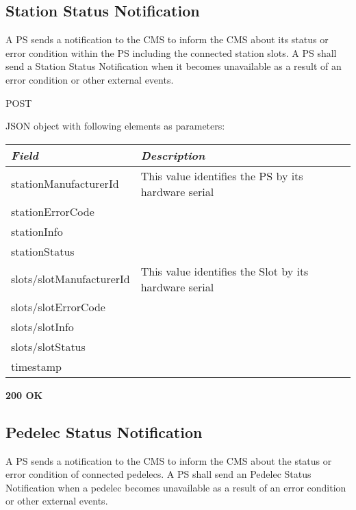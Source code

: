 
\subsection{Station Status Notification}

A \acs{PS} sends a notification to the \acs{CMS} to inform the \acs{CMS} about its status or error condition within the \acs{PS} including the connected station slots. A \acs{PS} shall send a Station Status Notification when it becomes unavailable as a result of an error condition or other external events.


 POST

JSON object with following elements as parameters:\\
\begin{tabularx}{\linewidth}{ | l | X | }
  \hline
  \textit{Field} & \textit{Description} \\
  \hline \hline
  stationManufacturerId 		& This value identifies the PS by its hardware serial\\
  stationErrorCode & \\
  stationInfo & \\
  stationStatus & \\
  slots/slotManufacturerId 	& This value identifies the Slot by its hardware serial \\
  slots/slotErrorCode & \\
  slots/slotInfo & \\
  slots/slotStatus & \\
  timestamp & \\
  
    \hline
\end{tabularx}

\textbf{200 OK}\\


\subsection{Pedelec Status Notification}

A \acs{PS} sends a notification to the \acs{CMS} to inform the \acs{CMS} about the status or error condition of connected pedelecs. A \acs{PS} shall send an Pedelec Status Notification when a pedelec becomes unavailable as a result of an error condition or other external events.


